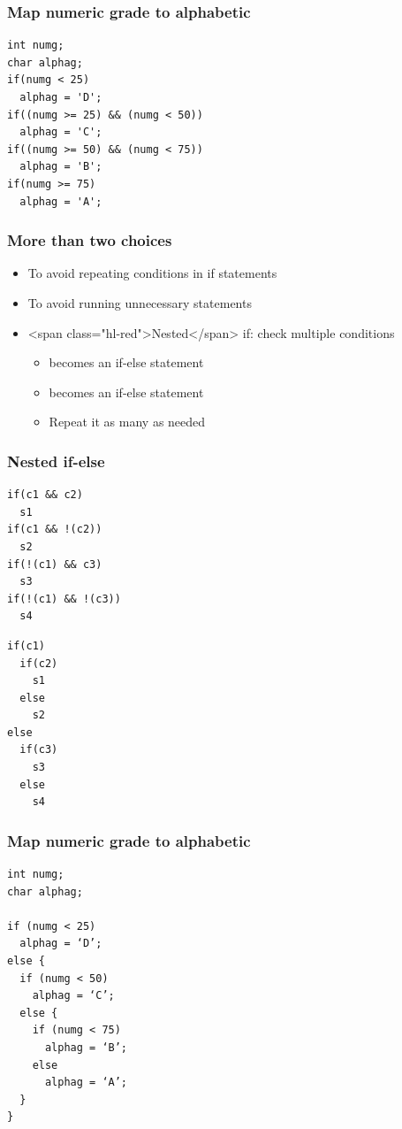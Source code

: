 \documentclass{../c-lecture}
\begin{document}
\begin{frame}[fragile]
  \frametitle{Map numeric grade to alphabetic}
  \begin{verbatim}
int numg;
char alphag;
if(numg < 25)
  alphag = 'D';
if((numg >= 25) && (numg < 50))
  alphag = 'C';
if((numg >= 50) && (numg < 75))
  alphag = 'B';
if(numg >= 75)
  alphag = 'A';
  \end{verbatim}
\end{frame}

\begin{frame}
  \frametitle{More than two choices}
  \begin{itemize}
    \item To avoid repeating conditions in if statements
    \item To avoid running unnecessary statements
    \item <span class="hl-red">Nested</span> if: check multiple conditions
    \begin{itemize}
      \item <Statements 1> becomes an if-else statement
      \item <Statements 2> becomes an if-else statement
      \item Repeat it as many as needed
    \end{itemize}
  \end{itemize}
\end{frame}

\begin{frame}[fragile]
  \frametitle{Nested if-else}
  \begin{verbatim}
if(c1 && c2)
  s1
if(c1 && !(c2))
  s2
if(!(c1) && c3)
  s3
if(!(c1) && !(c3))
  s4
  \end{verbatim}
  \begin{verbatim}
if(c1)
  if(c2)
    s1
  else
    s2
else
  if(c3)
    s3
  else
    s4
  \end{verbatim}
\end{frame}

\begin{frame}[fragile]
  \frametitle{Map numeric grade to alphabetic}
  \begin{verbatim}
int numg;
char alphag;

if (numg < 25)
  alphag = ‘D’;
else {
  if (numg < 50)
    alphag = ‘C’;
  else {
    if (numg < 75)
      alphag = ‘B’;
    else
      alphag = ‘A’;
  }
}
  \end{verbatim}
\end{frame}
\end{document}
